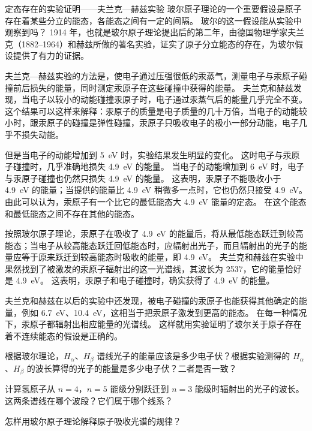\begin{Reading}{定态存在的实验证明——夫兰克—赫兹实验}
玻尔原子理论的一个重要假设是原子存在着某些分立的能态，各能态之间有一定的间隔。
玻尔的这一假设能从实验中观察到吗？
1914 年，也就是玻尔原子理论提出后的第二年，由德国物理学家夫兰克（1882--1964）和赫兹所做的著名实验，证实了原子分立能态的存在，为玻尔假设提供了有力的证据。

夫兰克—赫兹实验的方法是，使电子通过压强很低的汞蒸气，测量电子与汞原子碰撞前后损失的能量，同时测定汞原子在这些碰撞中获得的能量。
夫兰克和赫兹发现，当电子以较小的动能碰撞汞原子时，电子通过汞蒸气后的能量几乎完全不变。
这个结果可以这样来解释：汞原子的质量是电子质量的几十万倍，当电子的动能较小时，跟汞原子的碰撞是弹性碰撞，汞原子只吸收电子的极小一部分动能，电子几乎不损失动能。

但是当电子的动能增加到 \qty{5}{eV} 时，实验结果发生明显的变化。
这时电子与汞原子碰撞时，几乎准确地损失 \qty{4.9}{eV} 的能量。
当电子的动能增加到 \qty{6}{eV} 时，电子与汞原子碰撞也仍然只损失 \qty{4.9}{eV} 的能量。
这表明，汞原子不能吸收小于 \qty{4.9}{eV} 的能量；当提供的能量比 \qty{4.9}{eV} 稍微多一点时，它也仍然只接受 \qty{4.9}{eV}。
由此可以认为，汞原子有一个比它的最低能态大 \qty{4.9}{eV} 能量的定态。
在这个能态和最低能态之间不存在其他的能态。

按照玻尔原子理论，汞原子在吸收了 \qty{4.9}{eV} 的能量后，将从最低能态跃迁到较高能态；当电子从较高能态跃迁回低能态时，应辐射出光子，而且辐射出的光子的能量应等于原来跃迁到较高能态时吸收的能量，即 \qty{4.9}{eV}。
夫兰克和赫兹在实验中果然找到了被激发的汞原子辐射出的这一光谱线，其波长为 \qty{2537}{\text{\AA}}，它的能量恰好是 \qty{4.9}{eV}。
这表明，汞原子和电子碰撞时，确实获得了 \qty{4.9}{eV} 的能量。

夫兰克和赫兹在以后的实验中还发现，被电子碰撞的汞原子也能获得其他确定的能量，例如 \qty{6.7}{eV}、\qty{10.4}{eV}，这相当于把汞原子激发到更高的能态。
在每一种情况下，汞原子都辐射出相应能量的光谱线。
这样就用实验证明了玻尔关于原子存在着不连续能态的假设是正确的。
\end{Reading}

\begin{Practice}
\begin{question}
  \item 根据玻尔理论，$H_{\alpha}$、$H_{\beta}$ 谱线光子的能量应该是多少电子伏？根据实验测得的 $H_{\alpha}$、$H_{\beta}$ 的波长算得的光子的能量是多少电子伏？二者是否一致？
  \item 计算氢原子从 $n=4$，$n=5$ 能级分别跃迁到 $n=3$ 能级时辐射出的光子的波长。这两条谱线在哪个波段？它们属于哪个线系？
  \item 怎样用玻尔原子理论解释原子吸收光谱的规律？
\end{question}
\end{Practice}


